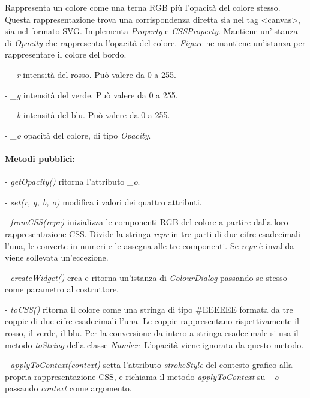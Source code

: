 Rappresenta un colore come una terna RGB pi\`u l'opacit\`a del colore stesso. Questa rappresentazione trova una corrispondenza diretta sia nel tag <canvas>, sia nel formato SVG.
Implementa \textit{Property} e \textit{CSSProperty}. Mantiene un'istanza di \textit{Opacity} che rappresenta l'opacit\`a del colore.
\textit{Figure} ne mantiene un'istanza per rappresentare il colore del bordo.
\begin{elencopuntato}[\subsubsecindent]
\item[-] \textit{\_r} intensit\`a del rosso. Pu\`o valere da 0 a 255.
\item[-] \textit{\_g} intensit\`a del verde. Pu\`o valere da 0 a 255.
\item[-] \textit{\_b} intensit\`a del blu. Pu\`o valere da 0 a 255.
\item[-] \textit{\_o} opacit\`a del colore, di tipo \textit{Opacity}.
\end{elencopuntato}
\paragraph{Metodi pubblici:}
\begin{elencopuntato}[\subsubsecindent]
\item[-] \textit{getOpacity()} ritorna l'attributo \textit{{\_}o}.
\item[-] \textit{set(r, g, b, o)} modifica i valori dei quattro attributi.
\item[-] \textit{fromCSS(repr)} inizializza le componenti RGB del colore a partire dalla loro rappresentazione CSS. Divide la stringa \textit{repr} in tre parti di due cifre esadecimali l'una, le converte in numeri e le assegna alle tre componenti. Se \textit{repr} \`e invalida viene sollevata un'eccezione.
\item[-] \textit{createWidget()} crea e ritorna un'istanza di \textit{ColourDialog} passando se stesso come parametro al costruttore.
\item[-] \textit{toCSS()} ritorna il colore come una stringa di tipo {\#}EEEEEE formata da tre coppie di due cifre esadecimali l'una. Le coppie rappresentano rispettivamente il rosso, il verde, il blu. Per la conversione da intero a stringa esadecimale si usa il metodo \textit{toString} della classe \textit{Number}. L'opacit\`a viene ignorata da questo metodo.
\item[-] \textit{applyToContext(context)} setta l'attributo \textit{strokeStyle} del contesto grafico alla propria rappresentazione CSS, e richiama il metodo \textit{applyToContext} su \textit{{\_}o} passando \textit{context} come argomento.
\end{elencopuntato}

